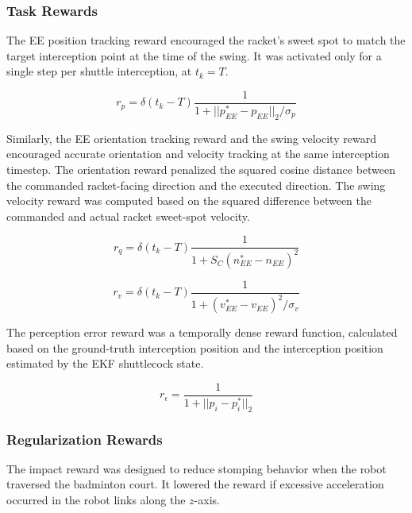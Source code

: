 \documentclass[9pt,twocolumn,twoside]{osajnl}
\begin{document}
\subsubsection*{Task Rewards}

The \ac{EE} position tracking reward encouraged the racket's sweet spot to match the target interception point at the time of the swing. It was activated only for a single step per shuttle interception, at $t_k = T$.

\begin{equation}
    r_{p} = \delta (t_k-T) \frac{1}{1+||p_{EE}^*-p_{EE}||_2/\sigma_{p}} \label{eq:rew_ee_pos}
\end{equation}

Similarly, the \ac{EE} orientation tracking reward and the swing velocity reward encouraged accurate orientation and velocity tracking at the same interception timestep. The orientation reward penalized the squared cosine distance between the commanded racket-facing direction and the executed direction. The swing velocity reward was computed based on the squared difference between the commanded and actual racket sweet-spot velocity.

\begin{equation}
    r_{q} = \delta (t_k-T) \frac{1}{1+S_C({n^*_{EE}-n_{EE}})^2}
\end{equation}


\begin{equation}
    r_{v} = \delta (t_k-T) \frac{1}{1+(v_{EE}^*-v_{EE})^2/\sigma_{v}}
\end{equation}

The perception error reward was a temporally dense reward function, calculated based on the ground-truth interception position and the interception position estimated by the \ac{EKF} shuttlecock state.

\begin{equation}
    r_{\epsilon} = \frac{1}{1+||p_{i} - p^*_{i}||_2} \label{eq:rew_perception}
\end{equation}

\subsubsection*{Regularization Rewards}

The impact reward was designed to reduce stomping behavior when the robot traversed the badminton court. It lowered the reward if excessive acceleration occurred in the robot links along the $z$-axis.
\end{document}
